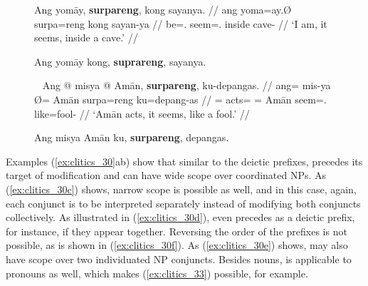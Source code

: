 \begin{figure}
\pex\label{ex:clitics_31}
\a\label{ex:clitics_31a}\begingl
	\gla Ang yomāy, \textbf{surpareng}, kong sayanya. //
	\glb ang yoma=ay.Ø surpa=reng kong sayan-ya //
	\glc \AgtT{} be=\Fsg{}.\Top{} seem=\TsgI{}.\Aarg{} inside cave-\Loc{} //
	\glft `I am, it seems, inside a cave.' //
\endgl


\a\label{ex:clitics_31b}
	Ang yomāy kong, \textbf{suprareng}, sayanya.
\xe
\end{figure}

\begin{figure}
\pex~\label{ex:clitics_32}
\a\label{ex:clitics_32a}\begingl
	\gla Ang @ misya {} @ Amān, \textbf{surpareng}, ku-depangas. //
	\glb ang= mis-ya Ø= Amān surpa=reng ku=depang-as //
	\glc \AgtT{}= acts=\TsgM{} \Top{}= Amān seem=\TsgI{}.\Aarg{} 
		like=fool-\Parg{} //
	\glft `Amān acts, it seems, like a fool.' //
\endgl


\a\label{ex:clitics_32b}\ljudge{*}
	Ang misya Amān ku, \textbf{surpareng}, depangas.
\xe
\end{figure}

Examples (\ref{ex:clitics_30}ab) show that similar to the deictic prefixes,
 precedes its target of modification and can have wide scope
over coordinated NPs. As (\ref{ex:clitics_30c}) shows, narrow scope is possible
as well, and in this case, again, each conjunct is to be interpreted separately
instead of  modifying both conjuncts collectively. As
illustrated in (\ref{ex:clitics_30d}),  even precedes
 as a deictic prefix, for instance, if they appear together.
Reversing the order of the prefixes is not possible, as is shown in
(\ref{ex:clitics_30f}). As (\ref{ex:clitics_30e}) shows,  may
also have scope over two individuated NP conjuncts. Besides nouns,
 is applicable to pronouns as well, which makes
(\ref{ex:clitics_33}) possible, for example.

